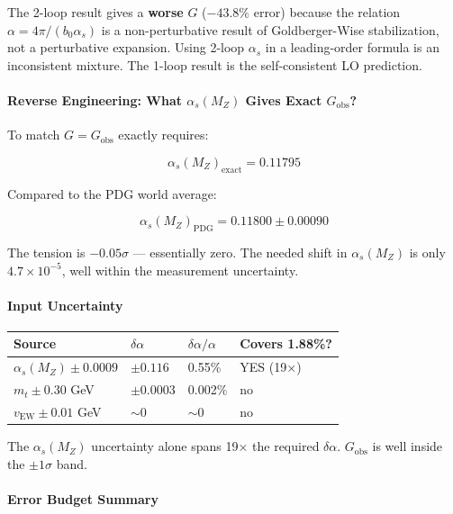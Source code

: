 \documentclass[
  11pt,
]{article}
\begin{document}
The 2-loop result gives a \textbf{worse} \(G\) (\(-43.8\%\) error)
because the relation \(\alpha = 4\pi/(b_0\alpha_s)\) is a
non-perturbative result of Goldberger-Wise stabilization, not a
perturbative expansion. Using 2-loop \(\alpha_s\) in a leading-order
formula is an inconsistent mixture. The 1-loop result is the
self-consistent LO prediction.

\hypertarget{reverse-engineering-what-alpha_sm_z-gives-exact-g_textobs}{%
\paragraph{\texorpdfstring{Reverse Engineering: What \(\alpha_s(M_Z)\)
Gives Exact
\(G_\text{obs}\)?}{Reverse Engineering: What \textbackslash alpha\_s(M\_Z) Gives Exact G\_\textbackslash text\{obs\}?}}\label{reverse-engineering-what-alpha_sm_z-gives-exact-g_textobs}}

To match \(G = G_\text{obs}\) exactly requires:

\[\alpha_s(M_Z)_\text{exact} = 0.11795 \tag{167}\]

Compared to the PDG world average:

\[\alpha_s(M_Z)_\text{PDG} = 0.11800 \pm 0.00090 \tag{168}\]

The tension is \textbf{\(-0.05\sigma\)} --- essentially zero. The needed
shift in \(\alpha_s(M_Z)\) is only \(4.7 \times 10^{-5}\), well within
the measurement uncertainty.

\hypertarget{input-uncertainty}{%
\paragraph{Input Uncertainty}\label{input-uncertainty}}

\begin{longtable}[]{@{}llll@{}}
\toprule
Source & \(\delta\alpha\) & \(\delta\alpha/\alpha\) & Covers
1.88\%?\tabularnewline
\midrule
\endhead
\(\alpha_s(M_Z) \pm 0.0009\) & \(\pm 0.116\) & 0.55\% & YES
(19×)\tabularnewline
\(m_t \pm 0.30\) GeV & \(\pm 0.0003\) & 0.002\% & no\tabularnewline
\(v_\text{EW} \pm 0.01\) GeV & \(\sim 0\) & \(\sim 0\) &
no\tabularnewline
\bottomrule
\end{longtable}

The \(\alpha_s(M_Z)\) uncertainty alone spans 19× the required
\(\delta\alpha\). \(G_\text{obs}\) is well inside the \(\pm 1\sigma\)
band.

\hypertarget{error-budget-summary}{%
\paragraph{Error Budget Summary}\label{error-budget-summary}}
\end{document}
